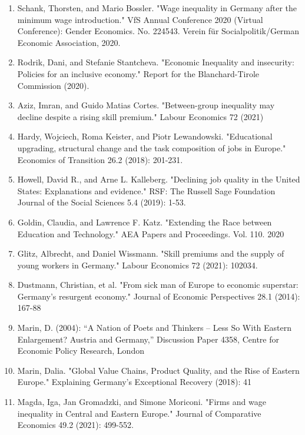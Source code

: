 \documentclass{article}
\begin{document}
\begin{enumerate}
\item Schank, Thorsten, and Mario Bossler. "Wage inequality in Germany after the minimum wage introduction." VfS Annual Conference 2020 (Virtual Conference): Gender Economics. No. 224543. Verein für Socialpolitik/German Economic Association, 2020.

\item Rodrik, Dani, and Stefanie Stantcheva. "Economic Inequality and insecurity: Policies for an inclusive economy." Report for the Blanchard-Tirole Commission (2020).

\item Aziz, Imran, and Guido Matias Cortes. "Between-group inequality may decline despite a rising skill premium." Labour Economics 72 (2021)

\item Hardy, Wojciech, Roma Keister, and Piotr Lewandowski. "Educational upgrading, structural change and the task composition of jobs in Europe." Economics of Transition 26.2 (2018): 201-231.

\item Howell, David R., and Arne L. Kalleberg. "Declining job quality in the United States: Explanations and evidence." RSF: The Russell Sage Foundation Journal of the Social Sciences 5.4 (2019): 1-53.

\item Goldin, Claudia, and Lawrence F. Katz. "Extending the Race between Education and Technology." AEA Papers and Proceedings. Vol. 110. 2020

\item Glitz, Albrecht, and Daniel Wissmann. "Skill premiums and the supply of young workers in Germany." Labour Economics 72 (2021): 102034.

\item Dustmann, Christian, et al. "From sick man of Europe to economic superstar: Germany's resurgent economy." Journal of Economic Perspectives 28.1 (2014): 167-88

\item Marin, D. (2004): “A Nation of Poets and Thinkers – Less So With Eastern Enlargement? Austria and Germany,” Discussion Paper 4358, Centre for Economic Policy Research, London

\item Marin, Dalia. "Global Value Chains, Product Quality, and the Rise of Eastern Europe." Explaining Germany’s Exceptional Recovery (2018): 41

\item Magda, Iga, Jan Gromadzki, and Simone Moriconi. "Firms and wage inequality in Central and Eastern Europe." Journal of Comparative Economics 49.2 (2021): 499-552.


\end{enumerate}
\end{document}
